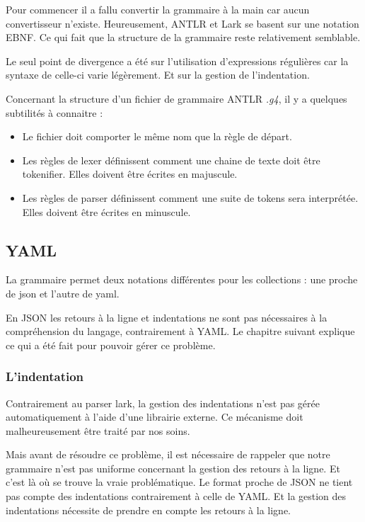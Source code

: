 \documentclass[
    iict, %
    il, %
]{heig-tb}
\begin{document}
Pour commencer il a fallu convertir la grammaire à la main car aucun convertisseur n'existe. Heureusement, ANTLR et Lark se basent sur une notation EBNF.
Ce qui fait que la structure de la grammaire reste relativement semblable.

Le seul point de divergence a été sur l'utilisation d'expressions régulières car la syntaxe de celle-ci varie légèrement. Et sur la gestion de l'indentation.

Concernant la structure d'un fichier de grammaire ANTLR \emph{.g4}, il y a quelques subtilités à connaitre :

\begin{itemize}
    \item Le fichier doit comporter le même nom que la règle de départ.
    \item Les règles de lexer définissent comment une chaine de texte doit être tokenifier. Elles doivent être écrites en majuscule.
    \item Les règles de parser définissent comment une suite de tokens sera interprétée. Elles doivent être écrites en minuscule.
\end{itemize}

\subsection{YAML}

La grammaire permet deux notations différentes pour les collections : une proche de json et l'autre de yaml.

En JSON les retours à la ligne et indentations ne sont pas nécessaires à la compréhension du langage, contrairement à YAML.
Le chapitre suivant explique ce qui a été fait pour pouvoir gérer ce problème.

\subsubsection{L'indentation}

Contrairement au parser lark, la gestion des indentations n'est pas gérée automatiquement à l'aide d'une librairie externe.
Ce mécanisme doit malheureusement être traité par nos soins.

Mais avant de résoudre ce problème, il est nécessaire de rappeler que notre grammaire n'est pas uniforme concernant la gestion des retours à la ligne.
Et c'est là où se trouve la vraie problématique.
Le format proche de JSON ne tient pas compte des indentations contrairement à celle de YAML.
Et la gestion des indentations nécessite de prendre en compte les retours à la ligne.
\end{document}

